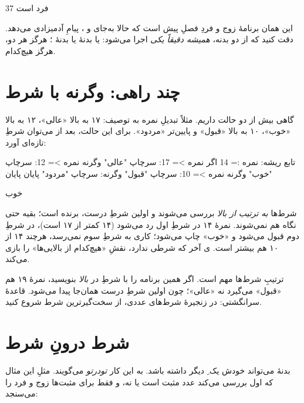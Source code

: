 \begin{progoutfa}
37 فرد است
\end{progoutfa}

این همان برنامهٔ زوج و فردِ فصلِ پیش است که حالا به‌جای  و
، پیامِ آدمیزادی می‌دهد. دقت کنید که از دو بدنه، \emph{همیشه
دقیقاً یکی} اجرا می‌شود: یا بدنهٔ  یا بدنهٔ ؛ هرگز هر
دو، هرگز هیچ‌کدام.

\section{چند راهی: وگرنه با شرط}

گاهی بیش از دو حالت داریم. مثلاً تبدیلِ نمره به توصیف: ۱۷ به بالا «عالی»،
۱۲ به بالا «خوب»، ۱۰ به بالا «قبول» و پایین‌تر «مردود». برای این حالت،
بعد از  می‌توان شرطِ تازه‌ای آورد:

\begin{salamfa}
تابع ریشه:
    نمره := 14
    اگر نمره >= 17:
        سرچاپ "عالی"
    وگرنه نمره >= 12:
        سرچاپ "خوب"
    وگرنه نمره >= 10:
        سرچاپ "قبول"
    وگرنه:
        سرچاپ "مردود"
    پایان
پایان
\end{salamfa}

\begin{progoutfa}
خوب
\end{progoutfa}

شرط‌ها \emph{به ترتیب از بالا} بررسی می‌شوند و اولین شرطِ درست، برنده است؛
بقیه حتی نگاه هم نمی‌شوند. نمرهٔ ۱۴ در شرطِ اول رد می‌شود (۱۴ کمتر از ۱۷
است)، در شرطِ دوم قبول می‌شود و «خوب» چاپ می‌شود؛ کاری به شرطِ سوم نمی‌رسد،
هرچند ۱۴ از ۱۰ هم بیشتر است. ی آخر که شرطی ندارد، نقشِ «هیچ‌کدام
از بالایی‌ها» را بازی می‌کند.

\begin{warn}
ترتیبِ شرط‌ها مهم است. اگر همین برنامه را با شرطِ  در
\emph{بالا} بنویسید، نمرهٔ ۱۹ هم «قبول» می‌گیرد نه «عالی»؛ چون اولین شرطِ
درست همان‌جا پیدا می‌شود. قاعدهٔ سرانگشتی: در زنجیرهٔ شرط‌های عددی، از
سخت‌گیرترین شرط شروع کنید.
\end{warn}

\section{شرط درونِ شرط}

بدنهٔ  می‌تواند خودش یک ِ دیگر داشته باشد. به این کار
\emph{تودرتو} می‌گویند. مثلِ این مثال که اول بررسی می‌کند عدد مثبت است یا
نه، و فقط برای مثبت‌ها زوج و فرد را می‌سنجد:

